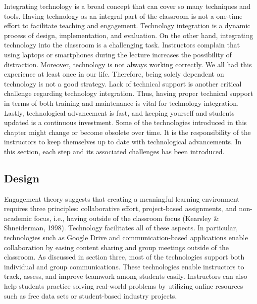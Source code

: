 \documentclass{book}
\begin{document}
Integrating technology is a broad concept that can cover so many techniques
and tools. Having technology as an integral part of the classroom is not a
one-time effort to facilitate teaching and engagement. Technology integration
is a dynamic process of design, implementation, and evaluation. On the other
hand, integrating technology into the classroom is a challenging task.
Instructors complain that using laptops or smartphones during the lecture
increases the possibility of distraction. Moreover, technology is not always
working correctly. We all had this experience at least once in our life.
Therefore, being solely dependent on technology is not a good strategy. Lack
of technical support is another critical challenge regarding technology
integration. Thus, having proper technical support in terms of both training
and maintenance is vital for technology integration. Lastly, technological
advancement is fast, and keeping yourself and students updated is a continuous
investment. Some of the technologies introduced in this chapter might change
or become obsolete over time. It is the responsibility of the instructors to
keep themselves up to date with technological advancements. In this section,
each step and its associated challenges has been introduced.

\hypertarget{design}{%
\subsection{Design}\label{design}}

Engagement theory suggests that creating a meaningful learning environment
requires three principles: collaborative effort, project-based assignments,
and non-academic focus, i.e., having outside of the classroom focus (Kearsley
\& Shneiderman, 1998). Technology facilitates all of these aspects. In
particular, technologies such as Google Drive and communication-based
applications enable collaboration by easing content sharing and group meetings
outside of the classroom. As discussed in section three, most of the
technologies support both individual and group communications. These
technologies enable instructors to track, assess, and improve teamwork among
students easily. Instructors can also help students practice solving
real-world problems by utilizing online resources such as free data sets or
student-based industry projects.
\end{document}
